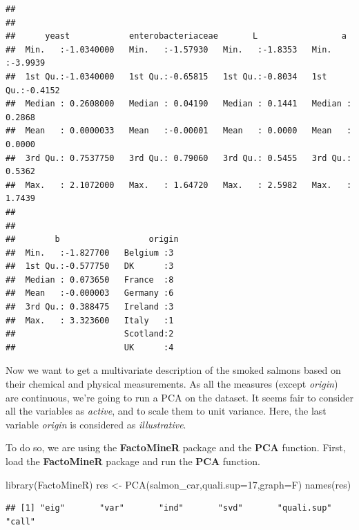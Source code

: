 \documentclass[
]{book}
\newenvironment{Shaded}{\begin{snugshade}}{\end{snugshade}}
\newcommand{\AttributeTok}[1]{\textcolor[rgb]{0.77,0.63,0.00}{#1}}
\newcommand{\DecValTok}[1]{\textcolor[rgb]{0.00,0.00,0.81}{#1}}
\newcommand{\FunctionTok}[1]{\textcolor[rgb]{0.00,0.00,0.00}{#1}}
\newcommand{\NormalTok}[1]{#1}
\newcommand{\OtherTok}[1]{\textcolor[rgb]{0.56,0.35,0.01}{#1}}
\begin{document}
\begin{verbatim}
##                                                             
##                                                             
##      yeast            enterobacteriaceae       L                 a          
##  Min.   :-1.0340000   Min.   :-1.57930   Min.   :-1.8353   Min.   :-3.9939  
##  1st Qu.:-1.0340000   1st Qu.:-0.65815   1st Qu.:-0.8034   1st Qu.:-0.4152  
##  Median : 0.2608000   Median : 0.04190   Median : 0.1441   Median : 0.2868  
##  Mean   : 0.0000033   Mean   :-0.00001   Mean   : 0.0000   Mean   : 0.0000  
##  3rd Qu.: 0.7537750   3rd Qu.: 0.79060   3rd Qu.: 0.5455   3rd Qu.: 0.5362  
##  Max.   : 2.1072000   Max.   : 1.64720   Max.   : 2.5982   Max.   : 1.7439  
##                                                                             
##                                                                             
##        b                  origin 
##  Min.   :-1.827700   Belgium :3  
##  1st Qu.:-0.577750   DK      :3  
##  Median : 0.073650   France  :8  
##  Mean   :-0.000003   Germany :6  
##  3rd Qu.: 0.388475   Ireland :3  
##  Max.   : 3.323600   Italy   :1  
##                      Scotland:2  
##                      UK      :4
\end{verbatim}

Now we want to get a multivariate description of the smoked salmons based on their chemical and physical measurements. As all the measures (except \emph{origin}) are continuous, we're going to run a PCA on the dataset. It seems fair to consider all the variables as \emph{active}, and to scale them to unit variance. Here, the last variable \emph{origin} is considered as \emph{illustrative}.

To do so, we are using the \textbf{FactoMineR} package and the \textbf{PCA} function. First, load the \textbf{FactoMineR} package and run the \textbf{PCA} function.

\begin{Shaded}
\begin{Highlighting}[]
\FunctionTok{library}\NormalTok{(FactoMineR)}
\NormalTok{res }\OtherTok{\textless{}{-}} \FunctionTok{PCA}\NormalTok{(salmon\_car,}\AttributeTok{quali.sup=}\DecValTok{17}\NormalTok{,}\AttributeTok{graph=}\NormalTok{F)}
\FunctionTok{names}\NormalTok{(res)}
\end{Highlighting}
\end{Shaded}

\begin{verbatim}
## [1] "eig"       "var"       "ind"       "svd"       "quali.sup" "call"
\end{verbatim}
\end{document}
